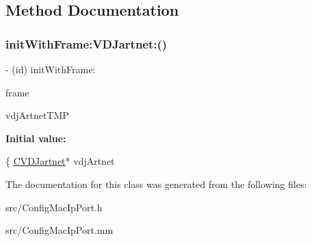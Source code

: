 \subsection{Method Documentation}
\mbox{\label{interfaceConfigIpPort_a0ec5c58834c67ee1271aa7f1a83239e9}} 
\subsubsection{\texorpdfstring{init\+With\+Frame\+:\+V\+D\+Jartnet\+:()}{initWithFrame:VDJartnet:()}}
{\footnotesize\ttfamily -\/ (id) init\+With\+Frame\+: \begin{DoxyParamCaption}\item[{(C\+G\+Rect)}]{frame }\item[{VDJartnet:(\hyperlink{classCVDJartnet}{C\+V\+D\+Jartnet}$\ast$)}]{vdj\+Artnet\+T\+MP }\end{DoxyParamCaption}}

{\bfseries Initial value\+:}
\begin{DoxyCode}
\{
    \hyperlink{classCVDJartnet}{CVDJartnet}* vdjArtnet
\end{DoxyCode}


The documentation for this class was generated from the following files\+:\begin{DoxyCompactItemize}
\item 
src/Config\+Mac\+Ip\+Port.\+h\item 
src/Config\+Mac\+Ip\+Port.\+mm\end{DoxyCompactItemize}
